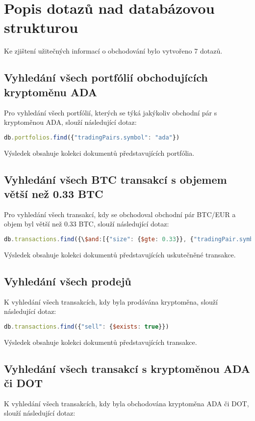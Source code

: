 \documentclass[12pt, a4paper]{article}
\let\oldsection\section
\renewcommand\section{\clearpage\oldsection}
\begin{document}
\section{Popis dotazů nad databázovou strukturou}
Ke zjištení užitečných informací o obchodování bylo vytvořeno 7 dotazů.

\subsection{Vyhledání všech portfólií obchodujících kryptoměnu ADA}
Pro vyhledání všech portfólií, kterých se týká jakýkoliv obchodní pár s kryptoměnou ADA, slouží následující dotaz:

\begin{lstlisting}[language=JavaScript]
db.portfolios.find({"tradingPairs.symbol": "ada"})
\end{lstlisting}
Výsledek obsahuje kolekci dokumentů představujících portfólia.

\subsection{Vyhledání všech BTC transakcí s objemem větší než 0.33 BTC}
Pro vyhledání všech transakcí, kdy se obchodoval obchodní pár BTC/EUR a objem byl větší než 0.33 BTC, slouží následující dotaz:

\begin{lstlisting}[language=JavaScript]
db.transactions.find({\$and:[{"size": {$gte: 0.33}}, {"tradingPair.symbol": "btc"}, {"tradingPair.currency": "eur"}]})

\end{lstlisting}
Výsledek obsahuje kolekci dokumentů představujících uskutečněné transakce.

\subsection{Vyhledání všech prodejů}
K vyhledání všech transakcích, kdy byla prodávána kryptoměna, slouží následující dotaz:

\begin{lstlisting}[language=JavaScript]
db.transactions.find({"sell": {$exists: true}})
\end{lstlisting}
Výsledek obsahuje kolekci dokumentů představujících transakce.


\subsection{Vyhledání všech transakcí s kryptoměnou ADA či DOT}
K vyhledání všech transakcích, kdy byla obchodována kryptoměna ADA či DOT, slouží následující dotaz:
\end{document}
